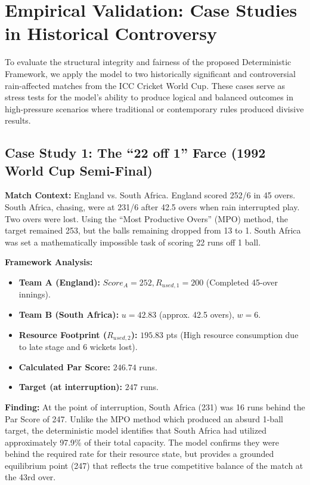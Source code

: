 \documentclass[12pt, letterpaper, fleqn]{article}
\begin{document}
\section{Empirical Validation: Case Studies in Historical Controversy}

\indent To evaluate the structural integrity and fairness of the proposed Deterministic Framework, we apply the model to two historically significant and controversial rain-affected matches from the ICC Cricket World Cup. These cases serve as stress tests for the model's ability to produce logical and balanced outcomes in high-pressure scenarios where traditional or contemporary rules produced divisive results.

\subsection{Case Study 1: The ``22 off 1'' Farce (1992 World Cup Semi-Final)}

\indent \textbf{Match Context:} England vs. South Africa. England scored 252/6 in 45 overs. South Africa, chasing, were at 231/6 after 42.5 overs when rain interrupted play. Two overs were lost. Using the ``Most Productive Overs'' (MPO) method, the target remained 253, but the balls remaining dropped from 13 to 1. South Africa was set a mathematically impossible task of scoring 22 runs off 1 ball.

\vspace{1em}
\noindent \textbf{Framework Analysis:}
\begin{itemize}
    \item \textbf{Team A (England):} $Score_A = 252, R_{used,1} = 200$ (Completed 45-over innings).
    \item \textbf{Team B (South Africa):} $u = 42.83$ (approx. 42.5 overs), $w = 6$.
    \item \textbf{Resource Footprint ($R_{used,2}$):} $195.83$ pts (High resource consumption due to late stage and 6 wickets lost).
    \item \textbf{Calculated Par Score:} $246.74$ runs.
    \item \textbf{Target (at interruption):} $247$ runs.
\end{itemize}

\indent \textbf{Finding:} At the point of interruption, South Africa (231) was 16 runs behind the Par Score of 247. Unlike the MPO method which produced an absurd 1-ball target, the deterministic model identifies that South Africa had utilized approximately 97.9\% of their total capacity. The model confirms they were behind the required rate for their resource state, but provides a grounded equilibrium point (247) that reflects the true competitive balance of the match at the 43rd over.
\end{document}
